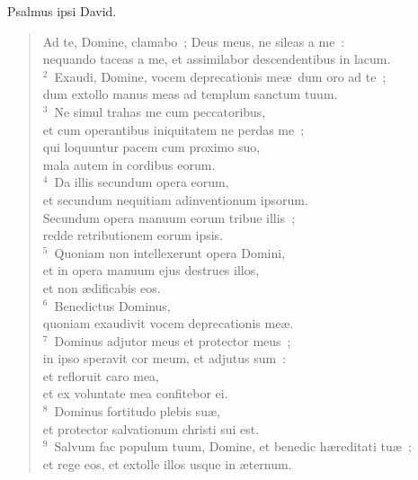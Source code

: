\lettrine[lines=3,image=true,loversize=0.05,lraise=-0.03]{P}{}salmus ipsi David. \begin{flushleft}\begin{verse}\vspace{6pt}Ad te, Domine, clamabo~; Deus meus, ne sileas a me~:\\ nequando taceas a me, et assimilabor descendentibus in lacum.\\
${}^{2}$~Exaudi, Domine, vocem deprecationis me\ae\ dum oro ad te~;\\ dum extollo manus meas ad templum sanctum tuum.\\
${}^{3}$~Ne simul trahas me cum peccatoribus,\\ et cum operantibus iniquitatem ne perdas me~;\\ qui loquuntur pacem cum proximo suo,\\ mala autem in cordibus eorum.\\
${}^{4}$~Da illis secundum opera eorum,\\ et secundum nequitiam adinventionum ipsorum.\\ Secundum opera manuum eorum tribue illis~;\\ redde retributionem eorum ipsis.\\
${}^{5}$~Quoniam non intellexerunt opera Domini,\\ et in opera manuum ejus destrues illos,\\ et non \ae dificabis eos.\\
${}^{6}$~Benedictus Dominus,\\ quoniam exaudivit vocem deprecationis me\ae .\\
${}^{7}$~Dominus adjutor meus et protector meus~;\\ in ipso speravit cor meum, et adjutus sum~:\\ et refloruit caro mea,\\ et ex voluntate mea confitebor ei.\\
${}^{8}$~Dominus fortitudo plebis su\ae ,\\ et protector salvationum christi sui est.\\
${}^{9}$~Salvum fac populum tuum, Domine, et benedic h\ae reditati tu\ae~;\\ et rege eos, et extolle illos usque in \ae ternum.\end{verse}\end{flushleft}



